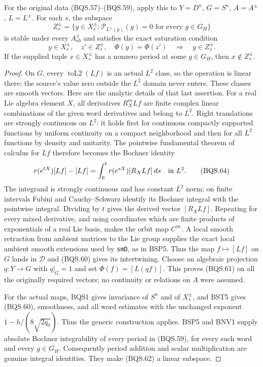 \documentclass[11pt,a4paper]{article}
\numberwithin{equation}{section}
\theoremstyle{remark}\newtheorem{remark}[theorem]{Remark}
\begin{document}
For the original data (BQS.57)--(BQS.59), apply this to
$Y=D^n$, $G=S^n$, $A=A^\pm$, $L=L^\pm$.
For each $s$, the subspace
\[
 Z_s^\pm=\{y\in X_s^\pm:
                     \mathcal P_{L^\pm(y)}(g)=0
                           \text{ for every }g\in G_H\}
 \tag{BQS.62}
\]
is stable under every $A^\pm_{ab}$ and satisfies the exact
saturation condition
\[
 y\in X_s^\pm,\quad z'\in Z_s^\pm,\quad \Phi(y)=\Phi(z')
                      \quad\Longrightarrow\quad y\in Z_s^\pm .
 \tag{BQS.63}
\]
If the supplied tuple $x\in X_s^\pm$ has a nonzero period
at some $g\in G_H$, then $x\notin Z_s^\pm$.

\begin{proof}
On $G$, every $\operatorname{toL2}(Lf)$ is an actual $L^2$ class,
so the operation is linear there; the source's value zero outside
the $L^2$ domain never enters.  These classes are smooth vectors.
Here are the analytic details of that last assertion.
For a real Lie algebra element $X$, all derivatives $R_X^mLf$
are finite complex linear combinations of the given word derivatives
and belong to $L^2$.
Right translations are strongly continuous on $L^2$:
it holds first for continuous compactly supported functions by
uniform continuity on a compact neighborhood and then for all
$L^2$ functions by density and unitarity.
The pointwise fundamental theorem of calculus for $Lf$ therefore
becomes the Bochner identity
\[
 r(e^{tX})[Lf]-[Lf]
                =\int_0^t r(e^{sX})[R_XLf]\,ds
                   \quad\hbox{in }L^2 .
 \tag{BQS.64}
\]
The integrand is strongly continuous and has constant $L^2$ norm;
on finite intervals Fubini and Cauchy--Schwarz identify its
Bochner integral with the pointwise integral.
Dividing by $t$ gives the derived vector $[R_XLf]$.
Repeating for every mixed derivative, and using coordinates which
are finite products of exponentials of a real Lie basis, makes
the orbit map $C^\infty$.  A local smooth retraction from ambient
matrices to the Lie group supplies the exact local ambient smooth
extensions used by \texttt{sm\allowbreak D}, as in BSP5.
Thus the map $f\mapsto[Lf]$ on $G$ lands in $\mathcal D$ and
(BQS.60) gives its intertwining.
Choose an algebraic projection $q:Y\to G$ with $q|_G=1$ and set
$\Phi(f)=[L(qf)]$.  This proves (BQS.61) on all the originally
required vectors; no continuity or relations on $A$ were assumed.

For the actual maps, BQS1 gives invariance of $S^n$ and of
$X_s^\pm$, and BST5 gives (BQS.60), smoothness, and all word
estimates with the unchanged exponent
$1-h/(8\sqrt{2q_0})$.
Thus the generic construction applies.
BSP5 and BNV1 supply absolute Bochner integrability of every
period in (BQS.59), for every such word and every $g\in G_H$.
Consequently period addition and scalar multiplication are genuine
integral identities.  They make (BQS.62) a linear subspace.


\end{proof}
\end{document}
